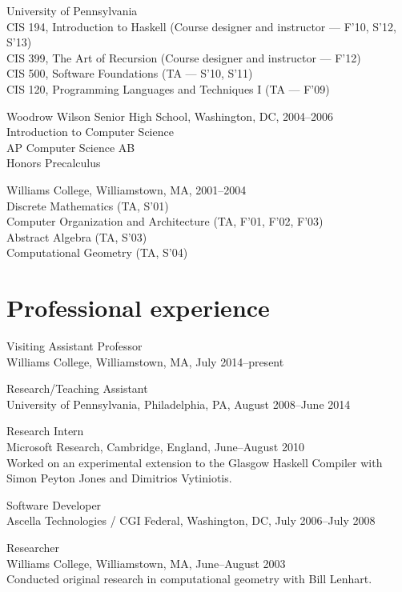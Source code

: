 \documentclass{article}
\newcommand{\cvitem}{\par\hangpara{2em}{1}}
\begin{document}
\cvitem
University of Pennsylvania \\
CIS 194, Introduction to Haskell (Course designer and instructor ---
F'10, S'12, S'13) \\
CIS 399, The Art of Recursion (Course designer and instructor ---
F'12) \\
CIS 500, Software Foundations (TA --- S'10, S'11) \\
CIS 120, Programming Languages and Techniques I (TA --- F'09)

\cvitem
Woodrow Wilson Senior High School, Washington, DC, 2004--2006 \\
Introduction to Computer Science \\
AP Computer Science AB \\
Honors Precalculus

\cvitem
Williams College, Williamstown, MA, 2001--2004 \\
Discrete Mathematics (TA, S'01) \\
Computer Organization and Architecture (TA, F'01, F'02, F'03) \\
Abstract Algebra (TA, S'03) \\
Computational Geometry (TA, S'04) \\

\section*{Professional experience}
\cvitem
Visiting Assistant Professor \\
Williams College, Williamstown, MA, July 2014--present

\cvitem
Research/Teaching Assistant \\
University of Pennsylvania, Philadelphia, PA, August 2008--June 2014

\cvitem
Research Intern \\
Microsoft Research, Cambridge, England, June--August 2010 \\
Worked on an experimental extension to the Glasgow Haskell Compiler with
Simon Peyton Jones and Dimitrios Vytiniotis.

\cvitem
Software Developer \\
Ascella Technologies / CGI Federal, Washington,
DC, July 2006--July 2008

\cvitem
Researcher \\
Williams College, Williamstown, MA, June--August 2003 \\
Conducted original research in computational geometry with Bill Lenhart.
\end{document}
